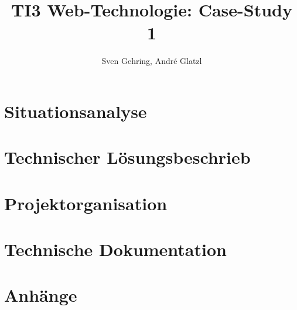 \documentclass{article}
\begin{document}

\title{\vspace{-2cm}TI3 Web-Technologie: Case-Study 1}
\author{Sven Gehring, André Glatzl}
\date{}
\maketitle

\begin{abstract}

\end{abstract}

\tableofcontents

\clearpage
\section{Situationsanalyse}




\clearpage
\section{Technischer Lösungsbeschrieb}




\clearpage
\section{Projektorganisation}





\clearpage
\section{Technische Dokumentation}


\clearpage


\clearpage
\section{Anhänge}


\end{document}
